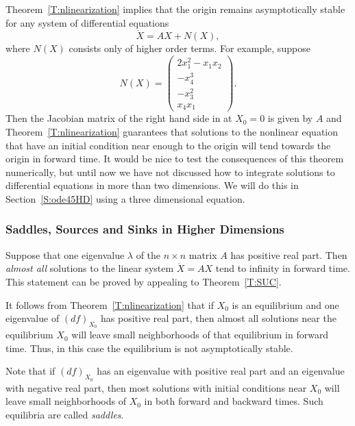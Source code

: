 \documentclass{ximera}
\begin{document}
Theorem~\ref{T:nlinearization} implies that the origin remains
asymptotically stable for any system of differential equations
\begin{equation} \label{e:fnonlin}
\dot{X} = AX + N(X),
\end{equation}
where $N(X)$ consists only of higher order terms.  For example, suppose
\begin{equation}  \label{E:fnonlin1}
N(X) = \left(\begin{array}{c} 2x_1^2-x_1x_2 \\ -x_4^3 \\  -x_3^2 \\ x_4x_1
\end{array} \right).
\end{equation}
Then the Jacobian matrix of the right hand side in  at $X_0 = 0$ 
is given by $A$ and Theorem~\ref{T:nlinearization} guarantees that solutions to 
the nonlinear equation  that have an initial condition near 
enough to the origin will tend towards the origin in forward time.  It would be 
nice to test the consequences of this theorem numerically, but until now we
have not discussed how to integrate solutions to differential equations in
more than two dimensions.  We will do this in Section~\ref{S:ode45HD} using a 
three dimensional equation. 

\subsubsection*{Saddles, Sources and Sinks in Higher Dimensions}

Suppose that one eigenvalue $\lambda$ of the $n\times n$ matrix $A$ has 
positive real part.  Then {\em almost all\/} solutions to the linear system 
$\dot{X}=AX$ tend to infinity in forward time.  This 
statement can be proved by appealing to Theorem~\ref{T:SUC}.    

It follows from Theorem~\ref{T:nlinearization} that if $X_0$ is an
equilibrium and one eigenvalue of $(df)_{X_0}$ has positive 
real part, then almost all solutions near the equilibrium $X_0$ will leave 
small neighborhoods of that equilibrium in forward time.  Thus, in this case 
the equilibrium is not asymptotically stable.

Note that if $(df)_{X_0}$ has an eigenvalue with positive real part and an
eigenvalue with negative real part, then most solutions with initial
conditions near $X_0$ will leave small neighborhoods of $X_0$ in both forward
and backward times.  Such equilibria are called {\em saddles\/}.
\end{document}
